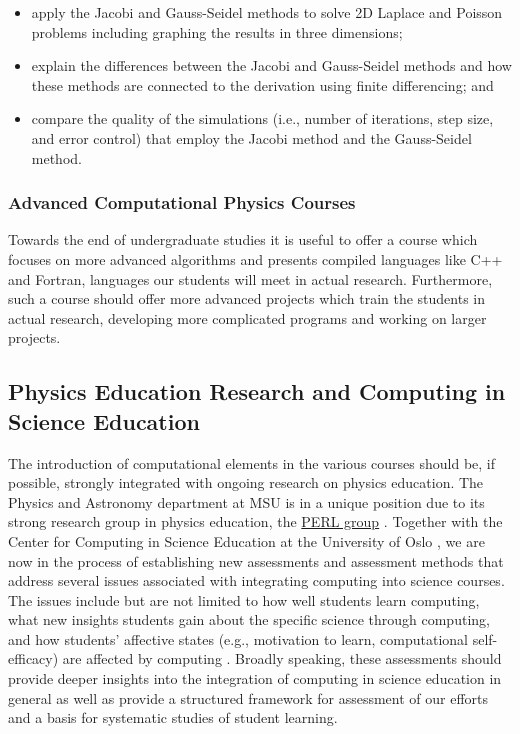 \documentclass[graybox,envcountchap,sectrefs]{svmult}
\begin{document}
\begin{itemize}
\item apply the Jacobi and Gauss-Seidel methods to solve 2D Laplace and Poisson problems including graphing the results in three dimensions;

\item explain the differences between the Jacobi and Gauss-Seidel methods and how these methods are connected to the derivation using finite differencing; and

\item compare the quality of the simulations (i.e., number of iterations, step size, and error control) that employ the Jacobi method and the Gauss-Seidel method.
\end{itemize}


\subsubsection{Advanced Computational Physics Courses}
Towards the end of undergraduate studies it is useful to offer a course which focuses on more advanced algorithms and presents compiled languages like C++ and Fortran, languages our students will meet in actual research.
Furthermore, such a course should offer more advanced projects which train the students in actual research, developing more complicated programs and working on larger projects.

\subsection{Physics Education Research and Computing in Science Education}
The introduction of computational elements in the various courses should be, if possible,  strongly integrated with ongoing research on physics education.
The Physics and Astronomy department at MSU is in a unique position due to its strong research group in physics education, the \href{{http://www.pa.msu.edu/research/physics-education-lab}}{PERL group} \cite{PERLMSU}. Together with the Center for Computing in Science Education at the University of Oslo \cite{CCSEUiO}, we are now in the process
of establishing new assessments
and assessment methods that address several issues associated with
integrating computing into science courses. The issues include but
are not limited to how well students learn computing, what new
insights students gain about the specific science through computing,
and how students' affective states (e.g., motivation to learn,
computational self-efficacy) are affected by computing . Broadly
speaking, these assessments should provide deeper insights into the
integration of computing  in science education in general as well as
provide a structured framework for assessment of our efforts and a
basis for systematic studies of student learning.
\end{document}
